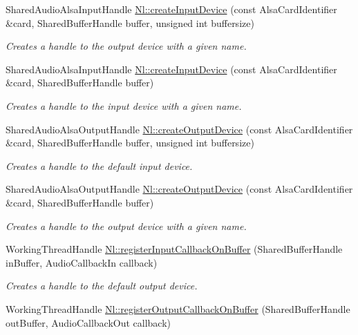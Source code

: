 \begin{DoxyCompactItemize}
Shared\-Audio\-Alsa\-Input\-Handle \hyperlink{group__Factory_ga2b4c065b7c2528769741f9cf37ca388f}{Nl\-::create\-Input\-Device} (const Alsa\-Card\-Identifier \&card, Shared\-Buffer\-Handle buffer, unsigned int buffersize)
\begin{DoxyCompactList}\small\item\em Creates a handle to the output device with a given {\itshape name}. \end{DoxyCompactList}\item 
Shared\-Audio\-Alsa\-Input\-Handle \hyperlink{group__Factory_ga08e9b8ea696d6cd9dd5cdaae6d9768d6}{Nl\-::create\-Input\-Device} (const Alsa\-Card\-Identifier \&card, Shared\-Buffer\-Handle buffer)
\begin{DoxyCompactList}\small\item\em Creates a handle to the input device with a given {\itshape name}. \end{DoxyCompactList}\item 
Shared\-Audio\-Alsa\-Output\-Handle \hyperlink{group__Factory_gabc2ccb14b72daca4b6a458d66385cde4}{Nl\-::create\-Output\-Device} (const Alsa\-Card\-Identifier \&card, Shared\-Buffer\-Handle buffer, unsigned int buffersize)
\begin{DoxyCompactList}\small\item\em Creates a handle to the default input device. \end{DoxyCompactList}\item 
Shared\-Audio\-Alsa\-Output\-Handle \hyperlink{group__Factory_ga7e01ecc892f599526a862a53e0c672d7}{Nl\-::create\-Output\-Device} (const Alsa\-Card\-Identifier \&card, Shared\-Buffer\-Handle buffer)
\begin{DoxyCompactList}\small\item\em Creates a handle to the output device with a given {\itshape name}. \end{DoxyCompactList}\item 
Working\-Thread\-Handle \hyperlink{group__Factory_ga6cf9a9665bab65d08ad772de912c0012}{Nl\-::register\-Input\-Callback\-On\-Buffer} (Shared\-Buffer\-Handle in\-Buffer, Audio\-Callback\-In callback)
\begin{DoxyCompactList}\small\item\em Creates a handle to the default output device. \end{DoxyCompactList}\item 
Working\-Thread\-Handle \hyperlink{group__Factory_gaed5af7fdb6d3ff5d85b1f7dcdf72cb39}{Nl\-::register\-Output\-Callback\-On\-Buffer} (Shared\-Buffer\-Handle out\-Buffer, Audio\-Callback\-Out callback)

\end{DoxyCompactItemize}

